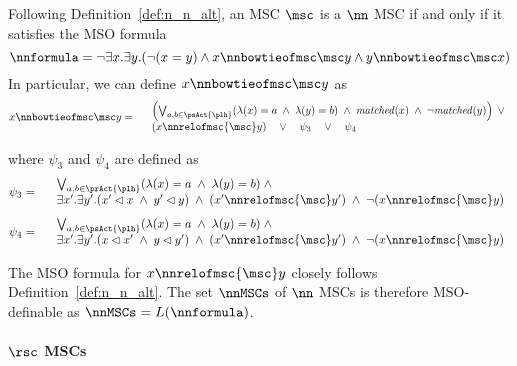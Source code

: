 Following Definition~\ref{def:n_n_alt}, an MSC $\msc$ is a $\nn$ MSC if and only if it satisfies the MSO formula
\[
	\nnformula = \neg \exists x.\exists y.(\neg (x = y) \wedge x \nnbowtieofmsc\msc y \wedge y \nnbowtieofmsc\msc x)
\]
In particular, we can define $x \nnbowtieofmsc\msc y$ as
\[
	x \nnbowtieofmsc\msc y =
	\begin{array}{rl}
	& \left(
		\bigvee_{\substack{a,b \in \psAct{\plh}}}
		(\lambda(x) = a \;\wedge\; \lambda(y) = b)
		\;\wedge\; \mathit{matched}(x) \;\wedge\; \neg \mathit{matched}(y)
	\right) \;\vee\\
	& (x \nnrelofmsc{\msc} y) \quad \vee \quad \psi_3 \quad \vee \quad \psi_4\\
	\end{array}
\]

\noindent where $\psi_3$ and $\psi_4$ are defined as
\[
	\psi_3 =
	\begin{array}{rl}
		& \bigvee_{\substack{a,b \in \prAct{\plh}}}
		  (\lambda(x) = a \;\wedge\; \lambda(y) = b)
		  \;\wedge\; \\
		& \exists x'.\exists y'.(x' \lhd x \;\wedge\; y' \lhd y) \;\wedge\; (x' \nnrelofmsc{\msc} y') \;\wedge\; \neg(x \nnrelofmsc{\msc} y)\\
	\end{array}
\]
\[
	\psi_4 =
	\begin{array}{rl}
		& \bigvee_{\substack{a,b \in \psAct{\plh}}}
		  (\lambda(x) = a \;\wedge\; \lambda(y) = b)
		  \;\wedge\; \\
		& \exists x'.\exists y'.(x \lhd x' \;\wedge\; y \lhd y') \;\wedge\; (x' \nnrelofmsc{\msc} y') \;\wedge\; \neg(x \nnrelofmsc{\msc} y)\\
	\end{array}
\]

The MSO formula for $x \nnrelofmsc{\msc} y$ closely follows Definition~\ref{def:n_n_alt}. The set $\nnMSCs$ of $\nn$ MSCs is therefore MSO-definable as $\nnMSCs=L(\nnformula)$.

\paragraph*{$\rsc$ MSCs}

